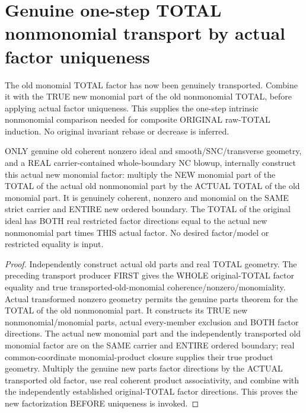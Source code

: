 \section{Genuine one-step TOTAL nonmonomial transport by actual factor uniqueness}

The old monomial TOTAL factor has now been genuinely transported. Combine
it with the TRUE new monomial part of the old nonmonomial TOTAL, before
applying actual factor uniqueness. This supplies the one-step intrinsic
nonmonomial comparison needed for composite ORIGINAL raw-TOTAL induction.
No original invariant rebase or decrease is inferred.

\begin{lemma}
\label{hir:sharp-actual-total-new-combined-monomial-factor-dictionary}
\leanok
ONLY genuine old coherent nonzero ideal and smooth/SNC/transverse geometry,
and a REAL carrier-contained whole-boundary NC blowup, internally construct
this actual new monomial factor: multiply the NEW monomial part of the
TOTAL of the actual old nonmonomial part by the ACTUAL TOTAL of the old
monomial part. It is genuinely coherent, nonzero and monomial on the SAME
strict carrier and ENTIRE new ordered boundary. The TOTAL of the original
ideal has BOTH real restricted factor directions equal to the actual new
nonmonomial part times THIS actual factor. No desired factor/model or
restricted equality is input.
\end{lemma}
\begin{proof}
Independently construct actual old parts and real TOTAL geometry. The
preceding transport producer FIRST gives the WHOLE original-TOTAL factor
equality and true transported-old-monomial coherence/nonzero/monomiality.
Actual transformed nonzero geometry permits the genuine parts theorem for
the TOTAL of the old nonmonomial part. It constructs its TRUE new
nonmonomial/monomial parts, actual every-member exclusion and BOTH factor
directions. The actual new monomial part and the independently transported
old monomial factor are on the SAME carrier and ENTIRE ordered boundary;
real common-coordinate monomial-product closure supplies their true product
geometry. Multiply the genuine new parts factor directions by the ACTUAL
transported old factor, use real coherent product associativity, and combine
with the independently established original-TOTAL factor directions.
This proves the new factorization BEFORE uniqueness is invoked.
\end{proof}

